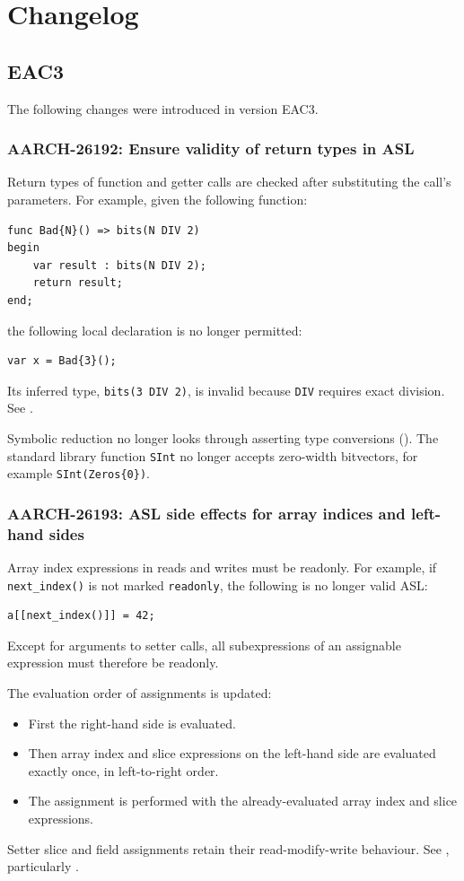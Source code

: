 \chapter*{Changelog}

\section*{EAC3}

The following changes were introduced in version EAC3.
\subsection*{AARCH-26192: Ensure validity of return types in ASL}

Return types of function and getter calls are checked after substituting the call's parameters.
For example, given the following function:
\begin{lstlisting}
func Bad{N}() => bits(N DIV 2)
begin
    var result : bits(N DIV 2);
    return result;
end;
\end{lstlisting}
the following local declaration is no longer permitted:
\begin{lstlisting}
var x = Bad{3}();
\end{lstlisting}
Its inferred type, \lstinline{bits(3 DIV 2)}, is invalid because \lstinline{DIV} requires exact division.
See .

Symbolic reduction no longer looks through asserting type conversions ().
The standard library function \lstinline{SInt} no longer accepts zero-width bitvectors, for example \lstinline|SInt(Zeros{0})|.

\subsection*{AARCH-26193: ASL side effects for array indices and left-hand sides}

Array index expressions in reads and writes must be readonly.
For example, if \lstinline{next_index()} is not marked \lstinline{readonly}, the following is no longer valid ASL:
\begin{lstlisting}
a[[next_index()]] = 42;
\end{lstlisting}
Except for arguments to setter calls, all subexpressions of an assignable expression must therefore be readonly.

The evaluation order of assignments is updated:
\begin{itemize}
  \item First the right-hand side is evaluated.
  \item Then array index and slice expressions on the left-hand side are evaluated exactly once, in left-to-right order.
  \item The assignment is performed with the already-evaluated array index and slice expressions.
\end{itemize}
Setter slice and field assignments retain their read-modify-write behaviour.
See , particularly .

